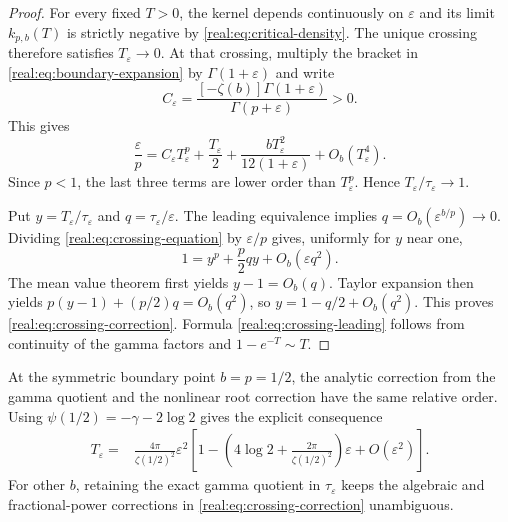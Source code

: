 \begin{proof}
For every fixed $T>0$, the kernel depends continuously on
$\varepsilon$ and its limit $k_{p,b}(T)$ is strictly negative by
\eqref{real:eq:critical-density}. The unique crossing therefore
satisfies $T_\varepsilon\to0$. At that crossing, multiply the
bracket in \eqref{real:eq:boundary-expansion} by
$\Gamma(1+\varepsilon)$ and write
\[
 C_\varepsilon=
 \frac{[-\zeta(b)]\Gamma(1+\varepsilon)}{\Gamma(p+\varepsilon)}>0.
\]
This gives
\begin{equation}\label{real:eq:crossing-equation}
 \frac{\varepsilon}{p}
 =C_\varepsilon T_\varepsilon^p+
   \frac{T_\varepsilon}{2}
   +\frac{bT_\varepsilon^2}{12(1+\varepsilon)}
   +O_b(T_\varepsilon^4).
\end{equation}
Since $p<1$, the last three terms are lower order than
$T_\varepsilon^p$. Hence
$T_\varepsilon/\tau_\varepsilon\to1$.

Put $y=T_\varepsilon/\tau_\varepsilon$ and
$q=\tau_\varepsilon/\varepsilon$.
The leading equivalence implies $q=O_b(\varepsilon^{b/p})\to0$.
Dividing \eqref{real:eq:crossing-equation} by $\varepsilon/p$
gives, uniformly for $y$ near one,
\[
 1=y^p+\frac p2 qy+O_b(\varepsilon q^2).
\]
The mean value theorem first yields $y-1=O_b(q)$. Taylor expansion
then yields $p(y-1)+(p/2)q=O_b(q^2)$, so
$y=1-q/2+O_b(q^2)$. This proves
\eqref{real:eq:crossing-correction}. Formula
\eqref{real:eq:crossing-leading} follows from continuity of the
gamma factors and $1-e^{-T}\sim T$.
\end{proof}

At the symmetric boundary point $b=p=1/2$, the analytic correction
from the gamma quotient and the nonlinear root correction have the
same relative order. Using $\psi(1/2)=-\gamma-2\log2$ gives the
explicit consequence
\begin{equation}\label{real:eq:half-boundary}
\begin{split}
 T_\varepsilon={}&\frac{4\pi}{\zeta(1/2)^2}\varepsilon^2
 \left[1-
 \left(4\log2+\frac{2\pi}{\zeta(1/2)^2}\right)\varepsilon
 +O(\varepsilon^2)\right].
\end{split}
\end{equation}
For other $b$, retaining the exact gamma quotient in
$\tau_\varepsilon$ keeps the algebraic and fractional-power
corrections in \eqref{real:eq:crossing-correction} unambiguous.

